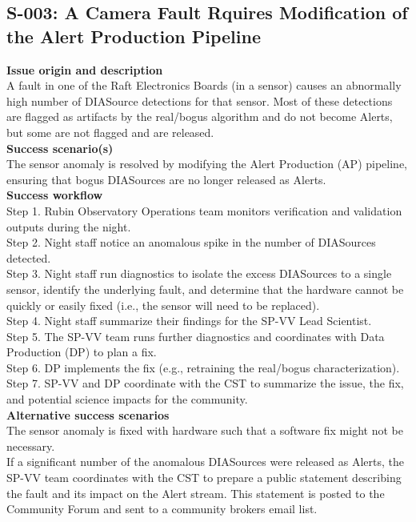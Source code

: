\subsection{S-003: A Camera Fault Rquires Modification of the Alert Production Pipeline}

\textbf {Issue origin and description} \\
A fault in one of the Raft Electronics Boards (in a sensor) causes an abnormally high number of DIASource detections for that sensor.
Most of these detections are flagged as artifacts by the real/bogus algorithm and do not become Alerts, but some are not flagged and are released. \\

\textbf {Success scenario(s)} \\
The sensor anomaly is resolved by modifying the Alert Production (AP) pipeline, ensuring that bogus DIASources are no longer released as Alerts. \\

\textbf {Success workflow} \\
Step 1. Rubin Observatory Operations team monitors verification and validation outputs during the night.\\
Step 2. Night staff notice an anomalous spike in the number of DIASources detected.\\
Step 3. Night staff run diagnostics to isolate the excess DIASources to a single sensor, identify the underlying fault, and determine that the hardware cannot be quickly or easily fixed (i.e., the sensor will need to be replaced).\\
Step 4. Night staff summarize their findings for the SP-VV Lead Scientist.\\
Step 5. The SP-VV team runs further diagnostics and coordinates with Data Production (DP) to plan a fix.\\
Step 6. DP implements the fix (e.g., retraining the real/bogus characterization).\\
Step 7. SP-VV and DP coordinate with the CST to summarize the issue, the fix, and potential science impacts for the community.\\

\textbf {Alternative success scenarios} \\
The sensor anomaly is fixed with hardware such that a software fix might not be necessary.\\
If a significant number of the anomalous DIASources were released as Alerts, the SP-VV team coordinates with the CST to prepare a public statement describing the fault and its impact on the Alert stream.
This statement is posted to the Community Forum and sent to a community brokers email list.\\

